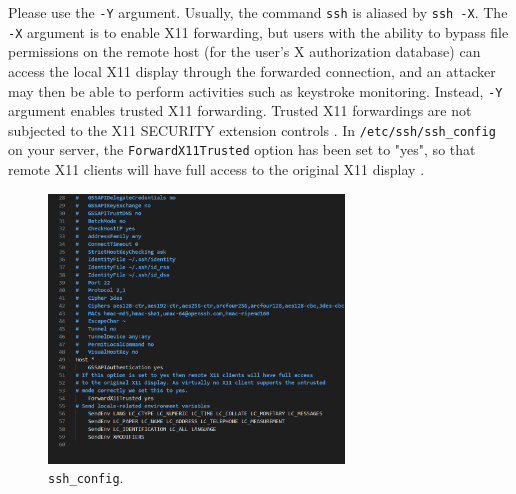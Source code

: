 \documentclass[a4paper,12pt,twoside]{article}
\begin{document}
Please use the \texttt{-Y} argument. Usually, the command \texttt{ssh} is aliased by \texttt{ssh -X}. The \texttt{-X} argument is to enable X11 forwarding, but users with the ability to bypass file permissions on the remote host (for the user's X authorization database) can access the local X11 display through the forwarded connection, and an attacker may then be able to perform activities such as keystroke monitoring. Instead, \texttt{-Y} argument enables trusted X11 forwarding. Trusted X11 forwardings are not subjected to the X11 SECURITY extension controls \cite{sshman}. In \texttt{/etc/ssh/ssh\_config} on your server, the \texttt{ForwardX11Trusted} option has been set to "yes", so that remote X11 clients will have full access to the original X11 display \cite{sshconfigman}.
\begin{figure}[H]
    \centering
    \includegraphics[width=0.7\textwidth]{images/6.png}
    \caption{\texttt{ssh\_config}.}
\end{figure}
\end{document}
